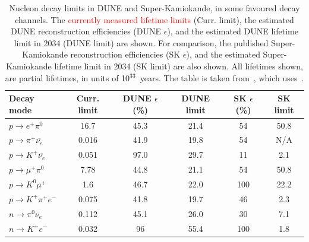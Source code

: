 \begin{table}
  \caption[Nucleon decay limits in DUNE and Super-Kamiokande, in some favoured decay channels]
          {Nucleon decay limits in DUNE and Super-Kamiokande, in some favoured decay channels. The \textcolor{red}{currently measured lifetime limits} (Curr. limit), the estimated DUNE reconstruction efficiencies (DUNE $\epsilon$), and the estimated DUNE lifetime limit in 2034 (DUNE limit) are shown. For comparison, the published Super-Kamiokande reconstruction efficiencies (SK $\epsilon$), and the estimated Super-Kamiokande lifetime limit in 2034 (SK limit) are also shown. All lifetimes shown, are partial lifetimes, in units of 10$^{33}$~years. The table is taken from~\citep{MauryLifetime}, which uses~\citep{PDGReview}.}
  \centering
  \label{tab:NDKLim}
  \begin{tabular}{l c c c c c}
    \toprule
    {Decay mode}                               & {Curr. limit} & {DUNE $\epsilon$ (\%)} & {DUNE limit} & {SK $\epsilon$ (\%)} & {SK limit} \\ 
    \midrule
    $p \rightarrow e^{+} \pi^{0}$              & 16.7          & 45.3              & 21.4         & 54              & 50.8       \\
    
    $p \rightarrow \pi^{+} \overline{\nu_{e}}$ & 0.016         & 41.9              & 19.8         & 54              & N/A        \\
    
    $p \rightarrow K^{+} \overline{\nu_{e}}$   & 0.051         & 97.0              & 29.7         & 11              & 2.1        \\
    
    $p \rightarrow \mu^{+} \pi^{0}$            & 7.78          & 44.8              & 21.1         & 54              & 50.8       \\
    
    $p \rightarrow K^{0} \mu^{+}$              & 1.6           & 46.7              & 22.0         & 100             & 22.2       \\

    $p \rightarrow K^{+} \pi^{+} e^{-}$        & 0.075         & 41.8              & 19.7         & 46              & 2.3        \\
    
    $n \rightarrow \pi^{0} \overline{\nu_{e}}$ & 0.112         & 45.1              & 26.0         & 30              & 7.1        \\
    
    $n \rightarrow K^{+} e^{-}$                & 0.032         & 96                & 55.4         & 100             & 1.8        \\
    \bottomrule
  \end{tabular}
\end{table}


